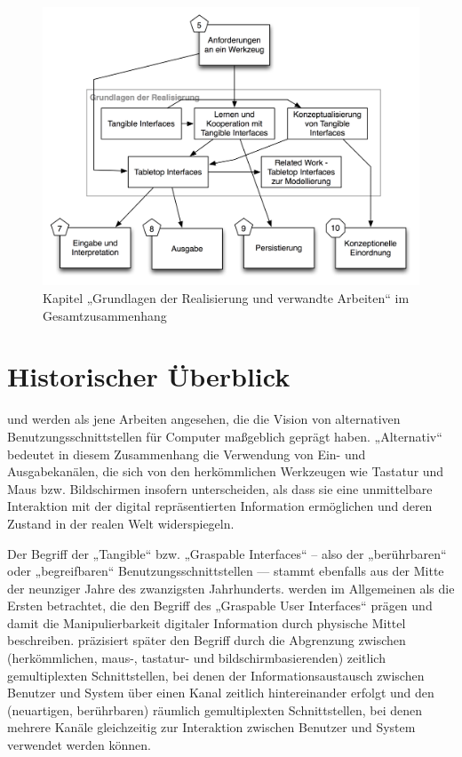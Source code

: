 \begin{figure}[htbp]
	\centering
		\includegraphics[scale=0.6]{img/Kontextgrafiken/k6.png}
	\caption{Kapitel „Grundlagen der Realisierung und verwandte Arbeiten“ im Gesamtzusammenhang}
	\label{fig:img_Kontextgrafiken_k6}
\end{figure}

\section{Historischer Überblick} %
\label{sec:entwicklung_tangible_interfaces}

\citet{Wellner93a} und \citet{Suzuki95} werden als jene Arbeiten angesehen, die die Vision von alternativen Benutzungsschnittstellen für Computer maßgeblich geprägt haben. „Alternativ“ bedeutet in diesem Zusammenhang die Verwendung von Ein- und Ausgabekanälen, die sich von den herkömmlichen Werkzeugen wie Tastatur und Maus bzw. Bildschirmen insofern unterscheiden, als dass sie eine unmittelbare Interaktion mit der digital repräsentierten Information ermöglichen und deren Zustand in der realen Welt widerspiegeln.

Der Begriff der „Tangible“ bzw. „Graspable Interfaces“ – also der „berührbaren“ oder „begreifbaren“ Benutzungsschnittstellen — stammt ebenfalls aus der Mitte der neunziger Jahre des zwanzigsten Jahrhunderts. \citet{Fitzmaurice95} werden im Allgemeinen als die Ersten betrachtet, die den Begriff des „Graspable User Interfaces“ prägen und damit die Manipulierbarkeit digitaler Information durch physische Mittel beschreiben. \citet{Fitzmaurice96} präzisiert später den Begriff durch die Abgrenzung zwischen (herkömmlichen, maus-, tastatur- und bildschirmbasierenden) zeitlich gemultiplexten Schnittstellen, bei denen der Informationsaustausch zwischen Benutzer und System über einen Kanal zeitlich hintereinander erfolgt und den (neuartigen, berührbaren) räumlich gemultiplexten Schnittstellen, bei denen mehrere Kanäle gleichzeitig zur Interaktion zwischen Benutzer und System verwendet werden können. 


